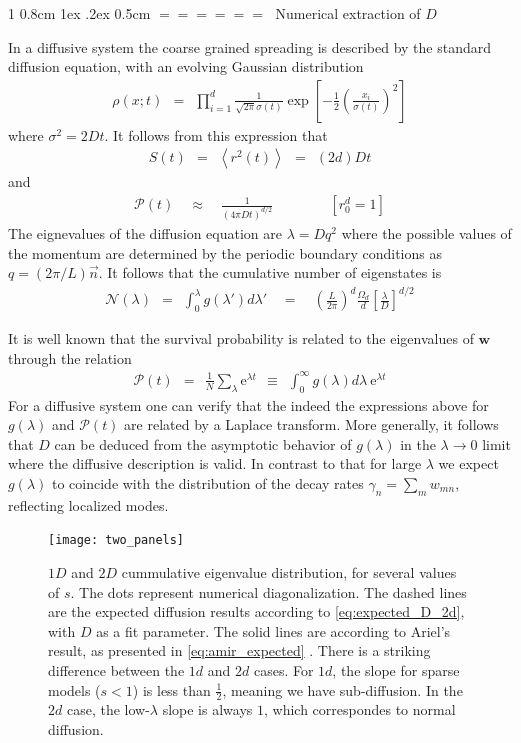 \documentclass[onecolumn,fleqn,notitlepage,secnumarabic]{revtex4}
\makeatletter
\newcommand{\eexp}{\mbox{e}^}
\newcommand{\beq}{\begin{eqnarray}}
\newcommand{\eeq}{\end{eqnarray}}
\def\section{%
  \@startsection
    {section}%
    {1}%
    {\z@}%
    {0.8cm \@plus1ex \@minus .2ex}%
    {0.5cm}%
    {\Large\bf $=\!=\!=\!=\!=\!=\;$}%
}%
\makeatother
\begin{document}
\section{Numerical extraction of $D$}\label{sec:num_d_2d}\label{diff}

In a diffusive system the coarse grained spreading 
is described by the standard diffusion equation,
with an evolving Gaussian distribution  
%  
\beq
\rho(x;t) \ \ = \ \ \prod_{i=1}^d \frac{1}{\sqrt{2\pi}\sigma(t)} 
\exp\left[-\frac{1}{2}\left(\frac{x_i}{\sigma(t)}\right)^2 \right]
\eeq
%
where $\sigma^2=2Dt$. It follows from this expression that 
% 
\beq
S(t) \ \ = \ \ \left\langle r^2(t) \right\rangle  \ \ = \ \ (2d)Dt
\eeq
%
and 
%
\beq
\mathcal{P}(t) \quad \approx \quad  \frac{1}{\left({4\pi D t}\right)^{d/2}} 
\qquad\qquad[r_0^d=1]
\eeq
%
The eignevalues of the diffusion equation are $\lambda=Dq^2$ 
where the possible values of the momentum are determined  
by the periodic boundary conditions as $q=(2\pi/L)\vec{n}$. 
It follows that the cumulative number of eigenstates is  
%
\beq \label{eq:expected_D_2d}
\mathcal{N}(\lambda) \ \ = \ \ 
\int_0^\lambda g(\lambda')d\lambda' \quad 
= \quad \left(\frac{L}{2\pi}\right)^d
\frac{\Omega_d}{d}
\left[\frac{\lambda}{D}\right]^{d/2}
\eeq



It is well known that the survival probability 
is related to the eigenvalues of $\bm{w}$ through the relation
%
\beq \label{eq:survival}
\mathcal{P}(t) \ \ = \ \ \frac{1}{N}\sum_\lambda \eexp{\lambda t} \ \ \equiv \ \ \int_0^{\infty} g(\lambda)d\lambda \ \eexp{\lambda t}
\eeq
%
For a diffusive system one can verify that the 
indeed the expressions above 
for $g(\lambda)$ and $\mathcal{P}(t)$ 
are related by a Laplace transform.  
%
More generally, it follows that $D$ can be deduced from 
the asymptotic behavior of $g(\lambda)$
in the ${\lambda\rightarrow 0}$ limit  
where the diffusive description is valid.
%
In contrast to that for large $\lambda$ we expect $g(\lambda)$ to coincide 
with the distribution of the decay rates $\gamma_n=\sum_{m}w_{mn}$, 
reflecting localized modes.


\begin{figure}[H]
\texttt{[image: two\_panels]}
\caption{ $1D$ and $2D$ cummulative eigenvalue distribution, 
for several values of $s$.
 The dots represent numerical diagonalization. The dashed lines are the expected diffusion results according to \eqref{eq:expected_D_2d}, with $D$ as a fit parameter. The solid lines are according to Ariel's result, as presented in \eqref{eq:amir_expected} . There is a striking difference between the $1d$ and $2d$ cases. For $1d$, the slope for sparse models ($s<1$) is less than $\frac{1}{2}$, meaning we have sub-diffusion. In the $2d$ case, the low-$\lambda$ slope is always $1$, which correspondes to normal diffusion.} \label{fig:exp_2d_D_vs_subD}
\end{figure}
\end{document}
